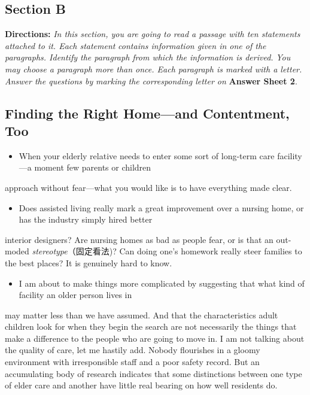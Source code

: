 \documentclass[UTF8,11pt]{ctexart}
\begin{document}
\subsection*{\textbf{Section B}}


\textbf{Directions:}\textit{ In this section, you are going to read a passage with ten statements attached to it. Each statement} \textit{contains information given in one of the paragraphs. Identify the paragraph from which the information is derived.} \textit{You may choose a paragraph more than once. Each paragraph is marked with a letter. Answer the questions by} \textit{marking the corresponding letter on}\textbf{ Answer Sheet 2}.


\subsection*{\textbf{Finding the Right Home—and Contentment, Too}}


\begin{itemize}[leftmargin=2em,itemsep=.2em,topsep=.4em]\item[A.] When your elderly relative needs to enter some sort of long-term care facility—a moment few parents or children
\end{itemize}

approach without fear—what you would like is to have everything made clear.


\begin{itemize}[leftmargin=2em,itemsep=.2em,topsep=.4em]\item[B.] Does assisted living really mark a great improvement over a nursing home, or has the industry simply hired better
\end{itemize}

interior designers? Are nursing homes as bad as people fear, or is that an out-moded\textit{ stereotype}（固定看法)? Can doing one's homework really steer families to the best places? It is genuinely hard to know.


\begin{itemize}[leftmargin=2em,itemsep=.2em,topsep=.4em]\item[C.] I am about to make things more complicated by suggesting that what kind of facility an older person lives in
\end{itemize}

may matter less than we have assumed. And that the characteristics adult children look for when they begin the search are not necessarily the things that make a difference to the people who are going to move in. I am not talking about the quality of care, let me hastily add. Nobody flourishes in a gloomy environment with irresponsible staff and a poor safety record. But an accumulating body of research indicates that some distinctions between one type of elder care and another have little real bearing on how well residents do.
\end{document}

